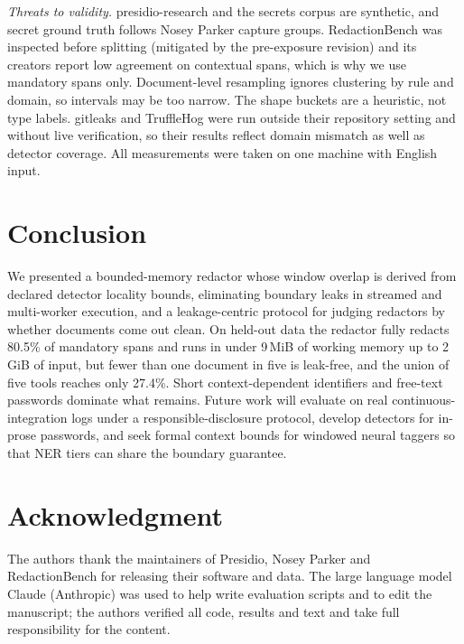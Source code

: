\documentclass[conference]{IEEEtran}
\begin{document}
\textit{Threats to validity.} presidio-research and the secrets corpus are
synthetic, and secret ground truth follows Nosey Parker capture groups.
RedactionBench was inspected before splitting (mitigated by the pre-exposure
revision) and its creators report low agreement on contextual spans, which is
why we use mandatory spans only. Document-level resampling ignores clustering
by rule and domain, so intervals may be too narrow. The shape buckets are a
heuristic, not type labels. gitleaks and TruffleHog were run outside their
repository setting and without live verification, so their results reflect
domain mismatch as well as detector coverage. All measurements were taken on
one machine with English input.

\section{Conclusion}

We presented a bounded-memory redactor whose window overlap is derived from
declared detector locality bounds, eliminating boundary leaks in streamed and
multi-worker execution, and a leakage-centric protocol for judging redactors
by whether documents come out clean. On held-out data the redactor fully
redacts 80.5\% of mandatory spans and runs in under 9\,MiB of working memory up
to 2\,GiB of input, but fewer than one document in five is leak-free, and the
union of five tools reaches only 27.4\%. Short context-dependent identifiers
and free-text passwords dominate what remains. Future work will evaluate on
real continuous-integration logs under a responsible-disclosure protocol,
develop detectors for in-prose passwords, and seek formal context bounds for
windowed neural taggers so that NER tiers can share the boundary guarantee.

\section*{Acknowledgment}
The authors thank the maintainers of Presidio, Nosey Parker and RedactionBench
for releasing their software and data. The large language model Claude
(Anthropic) was used to help write evaluation scripts and to edit the
manuscript; the authors verified all code, results and text and take full
responsibility for the content.



\end{document}
